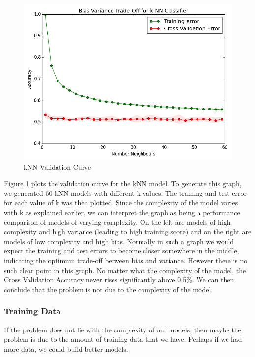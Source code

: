 \documentclass{report}
\begin{document}
\begin{figure}[H]
	\caption{kNN Validation Curve}
	\centerline{\includegraphics[width=\textwidth]{vis/prices-bias-variance.png}}
	\label{fig:knn-validation}
\end{figure}

Figure \ref{fig:knn-validation} plots the validation curve for the kNN model. To generate this graph, we generated 60 kNN models with different k values. The training and test error for each value of k was then plotted. Since the complexity of the model varies with k as explained earlier, we can interpret the graph as being a performance comparison of models of varying complexity. On the left are models of high complexity and high variance (leading to high training score) and on the right are models of low complexity and high bias. Normally in such a graph we would expect the training and test errors to become closer somewhere in the middle, indicating the optimum trade-off between bias and variance. However there is no such clear point in this graph. No matter what the complexity of the model, the Cross Validation Accuracy never rises significantly above 0.5\%. We can then conclude that the problem is not due to the complexity of the model.

\subsubsection{Training Data}

If the problem does not lie with the complexity of our models, then maybe the problem is due to the amount of training data that we have. Perhaps if we had more data, we could build better models.
\end{document}
